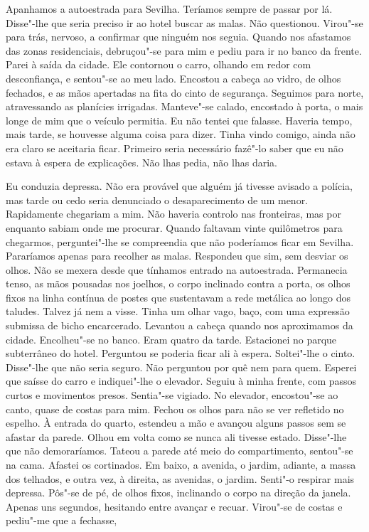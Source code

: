 Apanhamos a autoestrada para Sevilha. Teríamos sempre de passar por
lá. Disse"-lhe que seria preciso ir ao hotel buscar as malas. Não
questionou. Virou"-se para trás, nervoso, a confirmar que ninguém nos
seguia. Quando nos afastamos das zonas residenciais, debruçou"-se para
mim e pediu para ir no banco da frente. Parei à saída da cidade. Ele
contornou o carro, olhando em redor com desconfiança, e sentou"-se ao
meu lado. Encostou a cabeça ao vidro, de olhos fechados, e as mãos
apertadas na fita do cinto de segurança. Seguimos para norte,
atravessando as planícies irrigadas. Manteve"-se calado, encostado à
porta, o mais longe de mim que o veículo permitia. Eu não tentei que
falasse. Haveria tempo, mais tarde, se houvesse alguma coisa para dizer.
Tinha vindo comigo, ainda não era claro se aceitaria ficar. Primeiro
seria necessário fazê"-lo saber que eu não estava à espera de
explicações. Não lhas pedia, não lhas daria.

Eu conduzia depressa. Não era provável que alguém já tivesse avisado a
polícia, mas tarde ou cedo seria denunciado o desaparecimento de um
menor. Rapidamente chegariam a mim. Não haveria controlo nas fronteiras,
mas por enquanto sabiam onde me procurar. Quando faltavam vinte
quilômetros para chegarmos, perguntei"-lhe se compreendia que não
poderíamos ficar em Sevilha. Pararíamos apenas para recolher as malas.
Respondeu que sim, sem desviar os olhos. Não se mexera desde que
tínhamos entrado na autoestrada. Permanecia tenso, as mãos pousadas
nos joelhos, o corpo inclinado contra a porta, os olhos fixos na linha
contínua de postes que sustentavam a rede metálica ao longo dos taludes.
Talvez já nem a visse. Tinha um olhar vago, baço, com uma expressão
submissa de bicho encarcerado. Levantou a cabeça quando nos aproximamos
da cidade. Encolheu"-se no banco. Eram quatro da tarde. Estacionei no
parque subterrâneo do hotel. Perguntou se poderia ficar ali à espera.
Soltei"-lhe o cinto. Disse"-lhe que não seria seguro. Não perguntou
por quê nem para quem. Esperei que saísse do carro e indiquei"-lhe o
elevador. Seguiu à minha frente, com passos curtos e movimentos presos.
Sentia"-se vigiado. No elevador, encostou"-se ao canto, quase de costas
para mim. Fechou os olhos para não se ver refletido no espelho. À
entrada do quarto, estendeu a mão e avançou alguns passos sem se afastar
da parede. Olhou em volta como se nunca ali tivesse estado. Disse"-lhe
que não demoraríamos. Tateou a parede até meio do compartimento,
sentou"-se na cama. Afastei os cortinados. Em baixo, a avenida, o
jardim, adiante, a massa dos telhados, e outra vez, à direita, as
avenidas, o jardim. Senti"-o respirar mais depressa. Pôs"-se de pé, de
olhos fixos, inclinando o corpo na direção da janela. Apenas uns
segundos, hesitando entre avançar e recuar. Virou"-se de costas e
pediu"-me que a fechasse,

